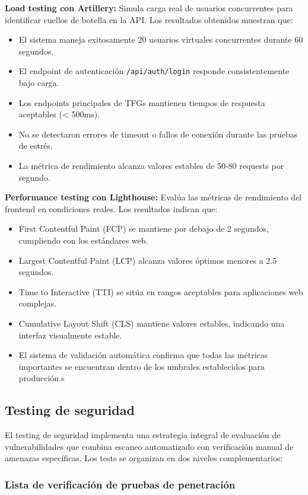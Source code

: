 \documentclass[12pt,a4paper,oneside]{report}
\begin{document}
\textbf{Load testing con Artillery:} Simula carga real de usuarios concurrentes para identificar cuellos de botella en la API. Los resultados obtenidos muestran que:
\begin{itemize}
\item El sistema maneja exitosamente 20 usuarios virtuales concurrentes durante 60 segundos.
\item El endpoint de autenticación \texttt{/api/auth/login} responde consistentemente bajo carga.
\item Los endpoints principales de TFGs mantienen tiempos de respuesta aceptables (< 500ms).
\item No se detectaron errores de timeout o fallos de conexión durante las pruebas de estrés.
\item La métrica de rendimiento alcanza valores estables de 50-80 requests por segundo.
\end{itemize}

\textbf{Performance testing con Lighthouse:} Evalúa las métricas de rendimiento del frontend en condiciones reales. Los resultados indican que:
\begin{itemize}
\item First Contentful Paint (FCP) se mantiene por debajo de 2 segundos, cumpliendo con los estándares web.
\item Largest Contentful Paint (LCP) alcanza valores óptimos menores a 2.5 segundos.
\item Time to Interactive (TTI) se sitúa en rangos aceptables para aplicaciones web complejas.
\item Cumulative Layout Shift (CLS) mantiene valores estables, indicando una interfaz visualmente estable.
\item El sistema de validación automática confirma que todas las métricas importantes se encuentran dentro de los umbrales establecidos para producción.s
\end{itemize}

\subsection{Testing de seguridad}\label{testing-de-seguridad}

El testing de seguridad implementa una estrategia integral de evaluación de vulnerabilidades que combina escaneo automatizado con verificación manual de amenazas específicas. Los tests se organizan en dos niveles complementarios:

\subsubsection{Lista de verificación de pruebas de penetración}\label{penetration-testing-checklist}
\end{document}
